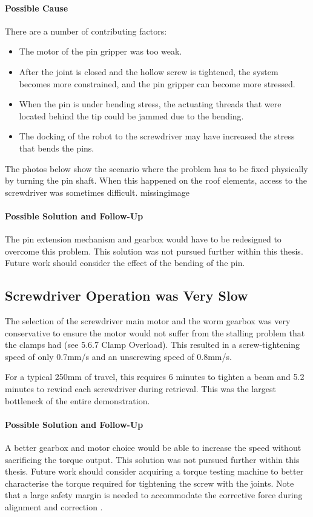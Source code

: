 \paragraph{Possible Cause}
There are a number of contributing factors:
\begin{itemize}
    \item The motor of the pin gripper was too weak.
    \item After the joint is closed and the hollow screw is tightened, the system becomes more constrained, and the pin gripper can become more stressed.
    \item When the pin is under bending stress, the actuating threads that were located behind the tip could be jammed due to the bending.
    \item The docking of the robot to the screwdriver may have increased the stress that bends the pins.
\end{itemize}
The photos below show the scenario where the problem has to be fixed physically by turning the pin shaft. When this happened on the roof elements, access to the screwdriver was sometimes difficult.
missingimage

\paragraph{Possible Solution and Follow-Up}
The pin extension mechanism and gearbox would have to be redesigned to overcome this problem. This solution was not pursued further within this thesis. Future work should consider the effect of the bending of the pin.

\subsection{Screwdriver Operation was Very Slow}
\label{subsection:exploration-4-screwdriver-operation-was-very-slow}

The selection of the screwdriver main motor and the worm gearbox was very conservative to ensure the motor would not suffer from the stalling problem that the clamps had (see 5.6.7 Clamp Overload). This resulted in a screw-tightening speed of only 0.7mm/s and an unscrewing speed of 0.8mm/s. 

For a typical 250mm of travel, this requires 6 minutes to tighten a beam and 5.2 minutes to rewind each screwdriver during retrieval. This was the largest bottleneck of the entire demonstration.

\paragraph{Possible Solution and Follow-Up}
A better gearbox and motor choice would be able to increase the speed without sacrificing the torque output. This solution was not pursued further within this thesis. Future work should consider acquiring a torque testing machine to better characterise the torque required for tightening the screw with the joints. Note that a large safety margin is needed to accommodate the corrective force during alignment and correction . 

